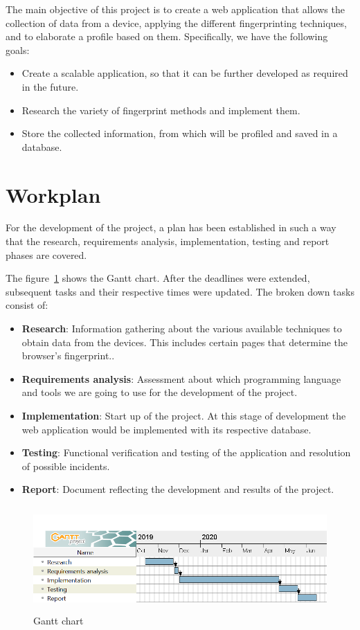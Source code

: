 The main objective of this project is to create a web application that allows the collection of data from a device, applying the different fingerprinting techniques, and to elaborate a profile based on them. Specifically, we have the following goals:
\begin{itemize}
    \item Create a scalable application, so that it can be further developed as required in the future.
    \item Research the variety of fingerprint methods and implement them.
    \item Store the collected information, from which will be profiled and saved in a database.
\end{itemize}

\section{Workplan}
For the development of the project, a plan has been established in such a way that the research, requirements analysis, implementation, testing and report phases are covered. \par
The figure~\ref{fig:diagramaGantten} shows the Gantt chart. After the deadlines were extended, subsequent tasks and their respective times were updated. The broken down tasks consist of:
\begin{itemize}
    \item \textbf{Research}: Information gathering about the various available techniques\cite{Huella} to obtain data from the devices. This includes certain pages that determine the browser's fingerprint.\cite{amiunique}.
    \item \textbf{Requirements analysis}: Assessment about which programming language and tools we are going to use for the development of the project.
    \item \textbf{Implementation}: Start up of the project. At this stage of development the web application would be implemented with its respective database.
    \item \textbf{Testing}: Functional verification and testing of the application and resolution of possible incidents.
    \item \textbf{Report}: Document reflecting the development and results of the project.
\end{itemize}
\begin{figure}[b]
    \includegraphics[width=1\textwidth, height=4cm]{Images/diagramaGantten.png}
    \caption{Gantt chart}
    \label{fig:diagramaGantten}
\end{figure}

